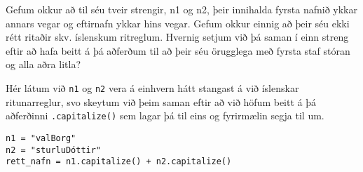 \begin{exercise}\label{str7}
Gefum okkur að til séu tveir strengir, n1 og n2, þeir innihalda fyrsta nafnið ykkar annars vegar og eftirnafn ykkar hins vegar.
Gefum okkur einnig að þeir séu ekki rétt ritaðir skv. íslenskum ritreglum.
Hvernig setjum við þá saman í einn streng eftir að hafa beitt á þá aðferðum til að þeir séu örugglega með fyrsta staf stóran og alla aðra litla?
\end{exercise}
\begin{Answer}[ref={str7}]
	Hér látum við \texttt{n1} og \texttt{n2} vera á einhvern hátt stangast á við íslenskar ritunarreglur, svo skeytum við þeim saman eftir að við höfum beitt á þá aðferðinni \texttt{.capitalize()} sem lagar þá til eins og fyrirmælin segja til um.
\begin{lstlisting}
n1 = "valBorg"
n2 = "sturluDóttir"
rett_nafn = n1.capitalize() + n2.capitalize()\end{lstlisting}
\end{Answer}

